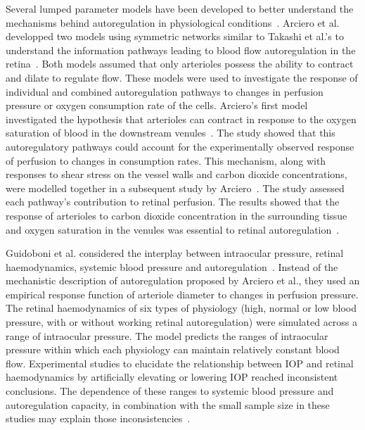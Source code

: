 \documentclass{article}
\begin{document}
Several lumped parameter models have been developed to better understand the mechanisms behind autoregulation in physiological conditions~\cite{Arciero_2008,Arciero_2013,Guidoboni_2014a}.
Arciero et al. developped two models using symmetric networks similar to Takashi et al.'s to understand the information pathways leading to blood flow autoregulation in the retina~\cite{Arciero_2008,Arciero_2013}.
Both models assumed that only arterioles possess the ability to contract and dilate to regulate flow.
These models were used to investigate the response of individual and combined autoregulation pathways to changes in perfusion pressure or oxygen consumption rate of the cells.
Arciero's first model investigated the hypothesis that arterioles can contract in response to the oxygen saturation of blood in the downstream venules~\cite{Arciero_2008}.
The study showed that this autoregulatory pathways could account for the experimentally observed response of perfusion to changes in consumption rates.
This mechanism, along with responses to shear stress on the vessel walls and carbon dioxide concentrations, were modelled together in a subsequent study by Arciero~\cite{Arciero_2013}.
The study assessed each pathway's contribution to retinal perfusion.
The results showed that the response of arterioles to carbon dioxide concentration in the surrounding tissue and oxygen saturation in the venules was essential to retinal autoregulation~\cite{Arciero_2013}.

Guidoboni et al. considered the interplay between intraocular pressure, retinal haemodynamics, systemic blood pressure and autoregulation~\cite{Guidoboni_2014a}.
Instead of the mechanistic description of autoregulation proposed by Arciero et al., they used an empirical response function of arteriole diameter to changes in perfusion pressure.
The retinal haemodynamics of six types of physiology (high, normal or low blood pressure, with or without working retinal autoregulation) were simulated across a range of intraocular pressure.
The model predicts the ranges of intraocular pressure within which each physiology can maintain relatively constant blood flow.
Experimental studies to elucidate the relationship between IOP and retinal haemodynamics by artificially elevating or lowering IOP reached inconsistent conclusions\cite{Conway_2010,Findl_1997}.
The dependence of these ranges to systemic blood pressure and autoregulation capacity, in combination with the small sample size in these studies may explain those inconsistencies~\cite{Guidoboni_2014a}.
\end{document}
